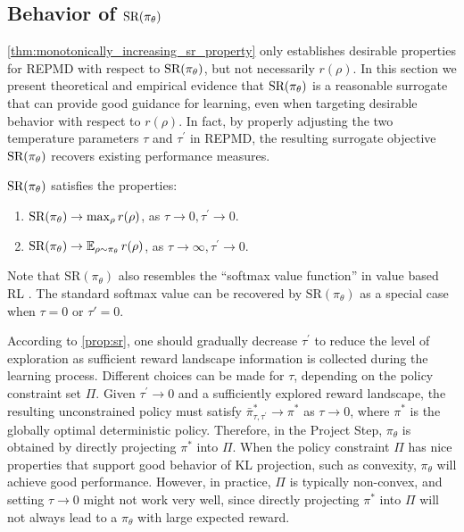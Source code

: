 \subsection{Behavior of $\text{SR}(\pi_\theta)$}
\label{subsec:sr}

\cref{thm:monotonically_increasing_sr_property} only establishes
desirable properties for REPMD with respect to $\text{SR}(\pi_\theta)$,
but not necessarily $r(\rho)$.
In this section we present theoretical and empirical evidence that
$\text{SR}(\pi_\theta)$ is a reasonable surrogate 
that can provide good guidance for learning,
even when targeting desirable behavior with respect to $r(\rho)$.
In fact, by properly adjusting the two temperature parameters $\tau$ and
$\tau^{\prime}$ in REPMD,
the resulting surrogate objective $\text{SR}(\pi_\theta)$
recovers existing performance measures.

\begin{prop}
\label{prop:sr}
$\text{SR}(\pi_\theta)$ satisfies the properties:
\begin{enumerate}[label=(\roman*)]
	\item  $\text{SR}(\pi_\theta) \to \max_{\rho}{r(\rho)}$, as $\tau \to 0, \tau^{\prime} \to 0$.
	\item $\text{SR}(\pi_\theta) \to \operatorname*{\mathbb{E}}_{\rho \sim \pi_\theta}{r(\rho)}$, as $\tau \to \infty, \tau^{\prime} \to 0$. 
\end{enumerate}	
\end{prop}

\begin{remk}
Note that $\text{SR}(\pi_\theta)$ also resembles the 
``softmax value function'' in value based RL
\citep{nachum2017bridging,haarnoja2018soft,ding2017cold}.
The standard softmax value can be recovered by
$\text{SR}(\pi_\theta)$ as a special case when $\tau = 0$ or $\tau'=0$. 
\end{remk}

According to \cref{prop:sr}, one should gradually decrease $\tau^{\prime}$
to reduce the level of exploration as sufficient reward landscape information
is collected during the learning process.
Different choices can be made for $\tau$,
depending on the policy constraint set $\Pi$.
Given $\tau^{\prime} \to 0$ and a sufficiently explored reward landscape,
the resulting unconstrained policy must satisfy
$\bar{\pi}_{\tau,\tau^{\prime}}^* \to \pi^*$ as $\tau \to 0$,
where $\pi^*$ is the globally optimal deterministic policy. 
Therefore, in the Project Step, $\pi_\theta$ is obtained by directly
projecting $\pi^*$ into $\Pi$.
When the policy constraint $\Pi$ has nice properties
that support good behavior of KL projection,
such as convexity,
$\pi_\theta$ will achieve good performance.
However, in practice, $\Pi$ is typically non-convex,
and setting $\tau \to 0$ might not work very well,
since directly projecting $\pi^*$ into $\Pi$ will not always lead to
a $\pi_\theta$ with large expected reward.



